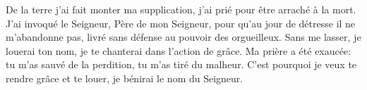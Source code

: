 De la terre j’ai fait monter ma supplication,
	j’ai prié pour être arraché à la mort.
J’ai invoqué le Seigneur, Père de mon Seigneur,
	pour qu’au jour de détresse il ne m’abandonne pas,
	livré sans défense au pouvoir des orgueilleux.
Sans me lasser, je louerai ton nom,
	je te chanterai dans l’action de grâce.
Ma prière a été exaucée:
	tu m’as sauvé de la perdition, tu m’as tiré du malheur.
C’est pourquoi je veux te rendre grâce et te louer,
	je bénirai le nom du Seigneur.

